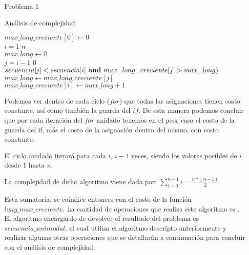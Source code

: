 \begin{section}{Problema 1}
\begin{subsection}{Análisis de complejidad}
		\begin{pseudo}
			\tab $max\_long\_creciente[0] \leftarrow 0$ 		 \\
			\tab \FOR $i=1$ \TO $n$ \\
			\tab \tab $max\_long \leftarrow 0$ 			 \\
			\tab \tab \FOR $j=i-1$ \TO $0$ 				\\
			\tab \tab \tab \IF $ secuencia[j] <  secuencia[i] \textbf{ and } max\_long\_creciente [j] > max\_long)$  \\
			\tab \tab \tab \tab  $max\_long \leftarrow max\_long\_creciente[j] $ 		 \\
			\tab \tab $max\_long\_creciente[i] \leftarrow max\_long+1$ 			 \\
		\end{pseudo}

		Podemos ver dentro de cada ciclo ($for$) que todas las asignaciones tienen costo constante, así como también la guarda 
		del $if$. De esta manera podemos concluir que por cada iteración del $for$ anidado tenemos en el peor caso el costo 
		de la guarda del if, más el costo de la asignación dentro del mismo, con costo constante.

		El ciclo anidado iterará para cada $i$, $i-1$ veces, siendo los valores posibles de $i$ desde $1$ hasta $n$.

		La complejidad de dicho algoritmo viene dada por: $\sum_{i=0}^{n-1} i = \frac{n*(n-1)}{2}$

		Esta sumatoria, se coindice entonces con el costo de la función $long\_max\_creciente$. La cantidad de operaciones que 
		realiza este algoritmo es .\\
	
		El algoritmo encargardo de devolver el resultado del problema es $secuencia\_unimodal$, el cual utiliza el algoritmo 
		descripto anteriormente y realizar algunas otras operaciones que se detallarán a continuación para concluir con el análisis 
		de complejidad.\\
	

\end{subsection}
\end{section}
